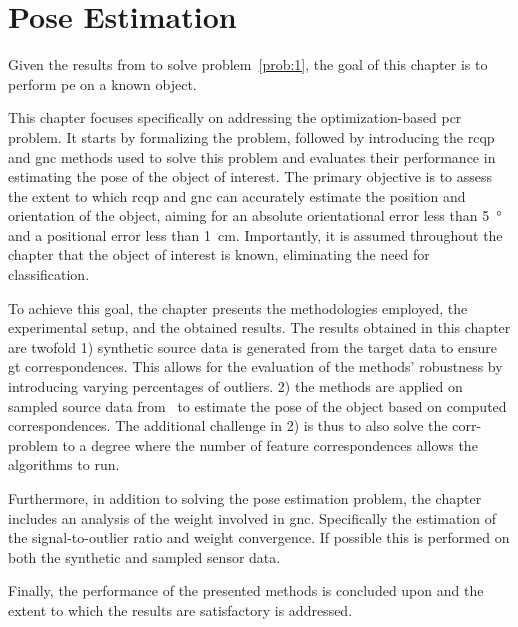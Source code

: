 \chapter{Pose Estimation}\label{ch:2-pose-estimation}

Given the results from  to solve problem~\ref{prob:1}, the goal of this chapter is to perform \gls{pe} on a known object.

This chapter focuses specifically on addressing the optimization-based \gls{pcr} problem. It starts by formalizing the problem, followed by introducing the \gls{rcqp} and \gls{gnc} methods used to solve this problem and evaluates their performance in estimating the pose of the object of interest. The primary objective is to assess the extent to which \gls{rcqp} and \gls{gnc} can accurately estimate the position and orientation of the object, aiming for an absolute orientational error less than \SI{5}{\degree} and a positional error less than \SI{1}{cm}. Importantly, it is assumed throughout the chapter that the object of interest is known, eliminating the need for classification.\medskip

To achieve this goal, the chapter presents the methodologies employed, the experimental setup, and the obtained results. The results obtained in this chapter are twofold 1) synthetic source data is generated from the target data to ensure \gls{gt} correspondences. This allows for the evaluation of the methods' robustness by introducing varying percentages of outliers. 2) the methods are applied on sampled source data from~ to estimate the pose of the object based on computed correspondences. The additional challenge in 2) is thus to also solve the \gls{corr-problem} to a degree where the number of feature correspondences allows the algorithms to run. \medskip

Furthermore, in addition to solving the pose estimation problem, the chapter includes an analysis of the weight involved in \gls{gnc}. Specifically the estimation of the signal-to-outlier ratio and weight convergence. If possible this is performed on both the synthetic and sampled sensor data. \medskip

Finally, the performance of the presented methods is concluded upon and the extent to which the results are satisfactory is addressed.

